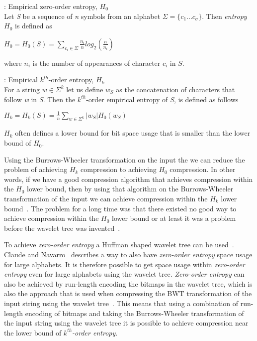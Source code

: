 \begin{mdframed}[nobreak, linecolor=lightgray, linewidth=2pt]
\begin{definition}: Empirical zero-order entropy, $H_0$ \\
Let \textit{S} be a sequence of \textit{n} symbols from an alphabet $\Sigma = \lbrace c_1 ... c_\sigma \rbrace$.
Then \textit{entropy} $H_0$ is defined as
\begin{center}
$H_0 = H_0(S) = \sum\limits_{c_i \in \Sigma} \frac{n_i}{n} log_2(\frac{n}{n_i})$
\end{center}
where $n_i$ is the number of appearances of character $c_i$ in $S$.
\end{definition}
\begin{definition}: Empirical $k^{th}$-order entropy, $H_k$ \\
For a string $w \in \Sigma^k$ let us define $w_S$ as the concatenation of characters that follow \textit{w} in \textit{S}. 
Then the $k^{th}$-order empirical entropy of \textit{S}, is defined as follows
\begin{center}
$H_k = H_k(S) = \frac{1}{n} \sum\limits_{w \in \Sigma^k} | w_S |H_0(w_S)$
\end{center}
\end{definition}
\end{mdframed}
$H_k$ often defines a lower bound for bit space usage that is smaller than the lower bound of $H_0$\citep[Section~2]{waveletTreeEntropy}.

Using the Burrows-Wheeler transformation on the input the we can reduce the problem of achieving $H_k$ compression to achieving $H_0$ compression.
In other words, if we have a good compression algorithm that achieves compression within the $H_0$ lower bound, then by using that algorithm on the Burrows-Wheeler transformation of the input we can achieve compression within the $H_k$ lower bound~\citep[Introduction]{waveletTreeEntropy}.
The problem for a long time was that there existed no good way to achieve compression within the $H_0$ lower bound or at least it was a problem before the wavelet tree was invented~\citep[Introduction]{waveletTreeEntropy}.

To achieve \textit{zero-order entropy} a Huffman shaped wavelet tree can be used~\citep[Section~4]{FMcountOnBWT}. Claude and Navarro~\citep[Section~3]{Claude08practicalrankselect} describes a way to also have \textit{zero-order entropy} space usage for large alphabets. 
It is therefore possible to get space usage within \textit{zero-order entropy} even for large alphabets using the wavelet tree. 
\textit{Zero-order entropy} can also be achieved by run-length encoding the bitmaps in the wavelet tree, which is also the approach that is used when compressing the BWT transformation of the input string using the wavelet tree~\citep[Introduction (\textbf{B})]{waveletTreeEntropy}.
This means that using a combination of run-length encoding of bitmaps and taking the Burrows-Wheeler transformation of the input string using the wavelet tree it is possible to achieve compression near the lower bound of \textit{$k^{th}$-order entropy}.

